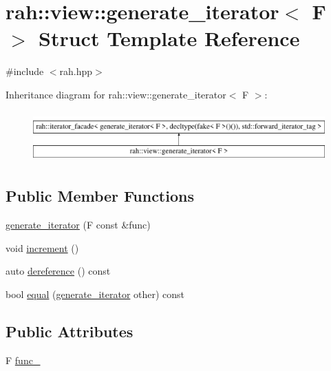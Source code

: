 \hypertarget{structrah_1_1view_1_1generate__iterator}{}\section{rah\+::view\+::generate\+\_\+iterator$<$ F $>$ Struct Template Reference}
\label{structrah_1_1view_1_1generate__iterator}


{\ttfamily \#include $<$rah.\+hpp$>$}

Inheritance diagram for rah\+::view\+::generate\+\_\+iterator$<$ F $>$\+:\begin{figure}[H]
\begin{center}
\leavevmode
\includegraphics[height=1.975309cm]{structrah_1_1view_1_1generate__iterator}
\end{center}
\end{figure}
\subsection*{Public Member Functions}
\begin{DoxyCompactItemize}
\item 
\mbox{\hyperlink{structrah_1_1view_1_1generate__iterator_a407696209d96fe38234970a91d23e35f}{generate\+\_\+iterator}} (F const \&func)
\item 
void \mbox{\hyperlink{structrah_1_1view_1_1generate__iterator_aeb0fc0db74bda811fe5d7cb8c6efe1e0}{increment}} ()
\item 
auto \mbox{\hyperlink{structrah_1_1view_1_1generate__iterator_ab7b0cf4a8f45cfd67278935bd9a39c13}{dereference}} () const
\item 
bool \mbox{\hyperlink{structrah_1_1view_1_1generate__iterator_a8cd374b2e2f6f9e9d3fc841140000f57}{equal}} (\mbox{\hyperlink{structrah_1_1view_1_1generate__iterator}{generate\+\_\+iterator}} other) const
\end{DoxyCompactItemize}
\subsection*{Public Attributes}
\begin{DoxyCompactItemize}
\item 
F \mbox{\hyperlink{structrah_1_1view_1_1generate__iterator_a72f19774c5fddd0a04a293bd08dce1cd}{func\+\_\+}}
\end{DoxyCompactItemize}


